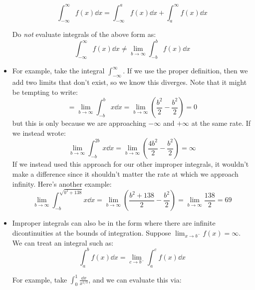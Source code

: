 \begin{itemize}
\begin{definition}
        \begin{equation}
            \int_{-\infty}^{\infty} f(x) \dd{x} = \int_{-\infty}^a f(x) \dd{x} + \int_a^\infty f(x) \dd{x}
        \end{equation}
    \end{definition}
    \begin{warning}
        Do \textit{not} evaluate integrals of the above form as:
        \begin{equation}
            \int_{-\infty}^{\infty} f(x) \dd{x} \neq \lim_{b\to \infty} \int_{-b}^b f(x) \dd{x}
        \end{equation}
    \end{warning}
    \item For example, take the integral $\int_{-\infty}^{\infty}$. If we use the proper definition, then we add two limits that don't exist, so we know this diverges. Note that it might be tempting to write:
    \begin{equation}
        = \lim_{b\to\infty} \int_{-b}^b x \dd{x} = \lim_{b\to \infty} \left(\frac{b^2}{2}-\frac{b^2}{2}\right) = 0
    \end{equation}
    but this is only because we are approaching $-\infty$ and $+\infty$ at the same rate. If we instead wrote:
    \begin{equation}
        \lim_{b\to \infty} \int_{-b}^{2b} x \dd{x} = \lim_{b\to\infty}\left(\frac{4b^2}{2}-\frac{b^2}{2}\right) = \infty
    \end{equation}
    If we instead used this approach for our other improper integrals, it wouldn't make a difference since it shouldn't matter the rate at which we approach infinity. Here's another example:
    \begin{equation}
        \lim_{b\to \infty} \int_{-b}^{\sqrt{b^2+138}} x \dd{x} = \lim_{b\to\infty} \left(\frac{b^2+138}{2} - \frac{b^2}{2}\right) = \lim_{b\to \infty} \frac{138}{2} = 69
    \end{equation}
    \item Improper integrals can also be in the form where there are infinite dicontinuities at the bounds of integration. Suppose $\lim_{x \to b^{-}} f(x) = \infty$. We can treat an integral such as:
    \begin{equation}
        \int_a^b f(x) \dd{x} = \lim_{c\to b^-} \int_a^c f(x) \dd{x}
    \end{equation}
    \begin{example}
        For example, take $\int_0^1 \frac{\dd{x}}{x^{1/3}}$, and we can evaluate this via:

\end{example}
\end{itemize}
